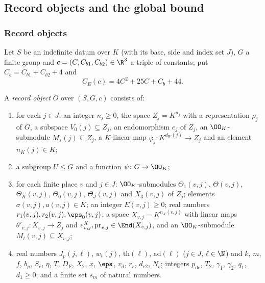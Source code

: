 \subsection{Record objects and the global bound}\label{sec:pf:onto3:record}

\subsubsection{Record objects}

Let $S$ be an indefinite datum over $K$ (with its base, side and index set $J$), $G$ a finite group and
$c=(C,C_{b1},C_{b2})\in\R^3$ a triple of constants; put $C_b=C_{b1}+C_{b2}+4$ and
\begin{equation}\label{eq:pf:onto3:CE}
C_E(c)=4C^2+25C+C_b+44 .
\end{equation}

\begin{definition}\label{pf:onto3:defobj}
A \emph{record object} $O$ over $(S,G,c)$ consists of:
\begin{enumerate}[label=(\alph*)]
\item for each $j\in J$: an integer $n_j\ge0$, the space $Z_j=K^{n_j}$ with a representation $\rho_j$ of $G$, a
subspace $V_0(j)\subseteq Z_j$, an endomorphism $e_j$ of $Z_j$, an $\OO_K$-submodule $M_s(j)\subseteq Z_j$, a
$K$-linear map $\varphi_j\colon K^{d_W(j)}\to Z_j$ and an element $n_K(j)\in K$;
\item a subgroup $U\le G$ and a function $\psi\colon G\to\OO_K$;
\item for each finite place $v$ and $j\in J$: $\OO_K$-submodules $\Theta_1(v,j)$, $\Theta(v,j)$, $\Theta_K(v,j)$,
$\Theta_0(v,j)$, $\Theta_J(v,j)$ and $X_3(v,j)$ of $Z_j$; elements $\sigma(v,j),a(v,j)\in K$; an integer
$E(v,j)\ge0$; real numbers $r_1(v,j),r_2(v,j),\eps_0(v,j)$; a space $X_{v,j}=K^{n_X(v,j)}$ with linear maps
$\theta'_{v,j}\colon X_{v,j}\to Z_j$ and $e^X_{v,j},\mathrm{pr}_{v,j}\in\End(X_{v,j})$, and an $\OO_K$-submodule
$M_t(v,j)\subseteq X_{v,j}$;
\item real numbers $J_p(j,\ell)$, $w_t(j)$, $\mathrm{th}(\ell)$, $\mathrm{ad}(\ell)$ ($j\in J$, $\ell\in\N$) and
$k$, $m$, $f$, $b_p$, $S_c$, $\eta$, $T$, $D_F$, $X_2$, $x$, $\eps$, $v_d$, $r_r$, $d_{e2}$, $N_c$; integers
$p_{\mathrm{de}}$, $T_2$, $\gamma_1$, $\gamma_2$, $q_1$, $d_1\ge0$; and a finite set $s_m$ of natural numbers.
\end{enumerate}
\end{definition}

